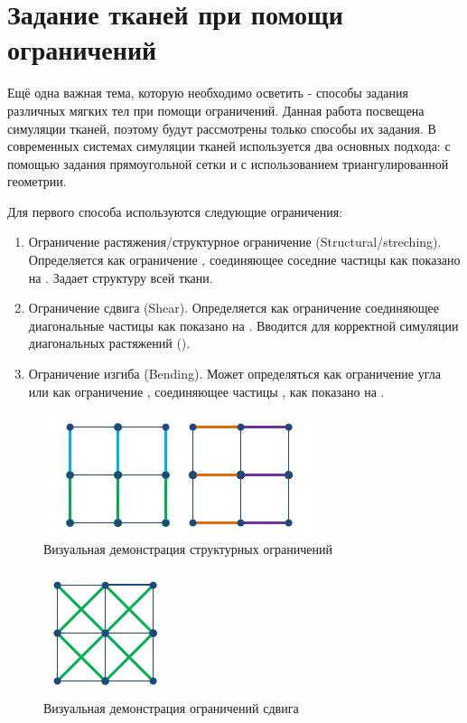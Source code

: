 \section{Задание тканей при помощи ограничений} \label{ch2:connect} %
	Ещё одна важная тема, которую необходимо осветить - способы задания различных мягких тел при помощи ограничений. Данная работа посвещена симуляции тканей, поэтому будут рассмотрены только способы их задания. В современных системах симуляции тканей используется два основных подхода: с помощью задания прямоугольной сетки и с использованием триангулированной геометрии.
	
	Для первого способа используются следующие ограничения:
	\begin{enumerate}[1.]
		\item Ограничение растяжения/структурное ограничение (Structural/streching). Определяется как ограничение , соединяющее соседние частицы как показано на . Задает структуру всей ткани.
		\item Ограничение сдвига (Shear). Определяется как ограничение  соединяющее диагональные частицы как показано на . Вводится для корректной симуляции диагональных растяжений ().
		\item Ограничение изгиба (Bending). Может определяться как ограничение угла \cite{wang2014angle} или как ограничение , соединяющее частицы , как показано на .
	\end{enumerate}
	
	\begin{figure}[ht!] 
		\center
		\includegraphics [scale=1] {my_folder/images//structural}
		\caption{Визуальная демонстрация структурных ограничений}
		\label{fig:structural}  
	\end{figure}
	
	\begin{figure}[ht!] 
		\center
		\includegraphics [scale=1] {my_folder/images//shear}
		\caption{Визуальная демонстрация ограничений сдвига}
		\label{fig:shear}  
	\end{figure}
	
